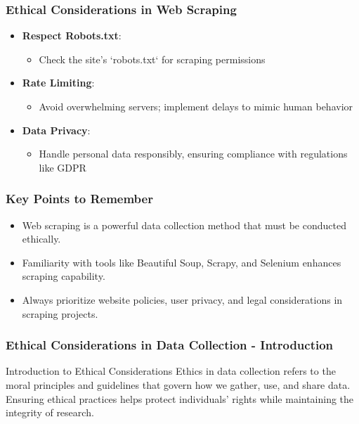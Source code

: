 \documentclass{beamer}
\begin{document}
\begin{frame}[fragile]
    \frametitle{Ethical Considerations in Web Scraping}
    \begin{itemize}
        \item \textbf{Respect Robots.txt}: 
            \begin{itemize}
                \item Check the site's `robots.txt` for scraping permissions
            \end{itemize}

        \item \textbf{Rate Limiting}: 
            \begin{itemize}
                \item Avoid overwhelming servers; implement delays to mimic human behavior
            \end{itemize}

        \item \textbf{Data Privacy}: 
            \begin{itemize}
                \item Handle personal data responsibly, ensuring compliance with regulations like GDPR
            \end{itemize}
    \end{itemize}
\end{frame}

\begin{frame}[fragile]
    \frametitle{Key Points to Remember}
    \begin{itemize}
        \item Web scraping is a powerful data collection method that must be conducted ethically.
        \item Familiarity with tools like Beautiful Soup, Scrapy, and Selenium enhances scraping capability.
        \item Always prioritize website policies, user privacy, and legal considerations in scraping projects.
    \end{itemize}
\end{frame}

\begin{frame}[fragile]
    \frametitle{Ethical Considerations in Data Collection - Introduction}
    \begin{block}{Introduction to Ethical Considerations}
        Ethics in data collection refers to the moral principles and guidelines that govern how we gather, use, and share data. 
        Ensuring ethical practices helps protect individuals' rights while maintaining the integrity of research.
    \end{block}
\end{frame}
\end{document}
